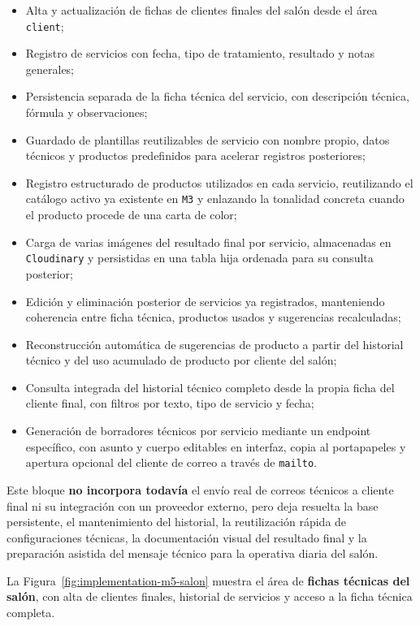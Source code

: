 \begin{itemize}
    \item Alta y actualización de fichas de clientes finales del salón desde el área \texttt{client};
    \item Registro de servicios con fecha, tipo de tratamiento, resultado y notas generales;
    \item Persistencia separada de la ficha técnica del servicio, con descripción técnica, fórmula y observaciones;
    \item Guardado de plantillas reutilizables de servicio con nombre propio, datos técnicos y productos predefinidos para acelerar registros posteriores;
    \item Registro estructurado de productos utilizados en cada servicio, reutilizando el catálogo activo ya existente en \texttt{M3} y enlazando la tonalidad concreta cuando el producto procede de una carta de color;
    \item Carga de varias imágenes del resultado final por servicio, almacenadas en \texttt{Cloudinary} y persistidas en una tabla hija ordenada para su consulta posterior;
    \item Edición y eliminación posterior de servicios ya registrados, manteniendo coherencia entre ficha técnica, productos usados y sugerencias recalculadas;
    \item Reconstrucción automática de sugerencias de producto a partir del historial técnico y del uso acumulado de producto por cliente del salón;
    \item Consulta integrada del historial técnico completo desde la propia ficha del cliente final, con filtros por texto, tipo de servicio y fecha;
    \item Generación de borradores técnicos por servicio mediante un endpoint específico, con asunto y cuerpo editables en interfaz, copia al portapapeles y apertura opcional del cliente de correo a través de \texttt{mailto}.
\end{itemize}

Este bloque \textbf{no incorpora todavía} el envío real de correos técnicos a cliente final ni su integración con un proveedor externo, pero deja resuelta la base persistente, el mantenimiento del historial, la reutilización rápida de configuraciones técnicas, la documentación visual del resultado final y la preparación asistida del mensaje técnico para la operativa diaria del salón.

La Figura~\ref{fig:implementation-m5-salon} muestra el área de \textbf{fichas técnicas del salón}, con alta de clientes finales, historial de servicios y acceso a la ficha técnica completa.

